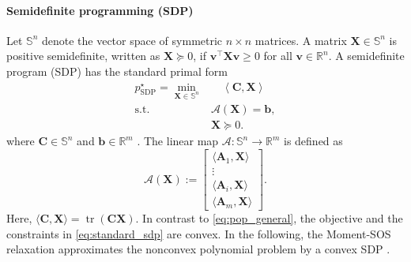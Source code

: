 \paragraph{Semidefinite programming (SDP)}
Let \(\mathbb{S}^{n}\) denote the vector space of symmetric \(n\times n\)
matrices. A matrix \(\bm{X}\in\mathbb{S}^{n}\) is positive semidefinite,
written as \(\bm{X}\succeq0\), if
\(\bm{v}^{\top}\bm{X}\bm{v}\geq0\) for all
\(\bm{v}\in\mathbb{R}^{n}\). A semidefinite program (SDP) has the standard
primal form
\begin{equation}
\begin{aligned}
 p_{\mathrm{SDP}}^\star
 =\min_{\bm{X}\in\mathbb{S}^{n}}
 &\quad \left\langle\bm{C},\bm{X}\right\rangle\\
 \text{s.t.}\quad
 &\mathcal{A}(\bm{X})=\bm{b},\\
 &\bm{X}\succeq0.
\end{aligned}
\label{eq:standard_sdp}
\end{equation}
where $\bm{C} \in \mathbb{S}^{n}$ and $\bm{b} \in \mathbb{R}^{m}$ \cite{Yang2024Semidefinite}. The linear map \(\mathcal{A}: \mathbb{S}^{n} \to \mathbb{R}^{m}\) is defined as
\begin{equation}
 \mathcal{A}(\bm{X})
 :=
 \begin{bmatrix}
 \langle\bm{A}_1,\bm{X}\rangle\\
 \vdots\\
 \langle\bm{A}_i,\bm{X}\rangle\\
 \langle\bm{A}_m,\bm{X}\rangle
 \end{bmatrix}.
 \label{eq:linear_map}
\end{equation}
Here, \(\langle\bm{C},\bm{X}\rangle=
\operatorname{tr}(\bm{C}\bm{X})\). 
In contrast to \eqref{eq:pop_general}, the objective and the
constraints in \eqref{eq:standard_sdp} are convex. In the following, the Moment-SOS 
relaxation approximates the nonconvex polynomial problem by a convex SDP \cite{Yang2024Semidefinite}.

